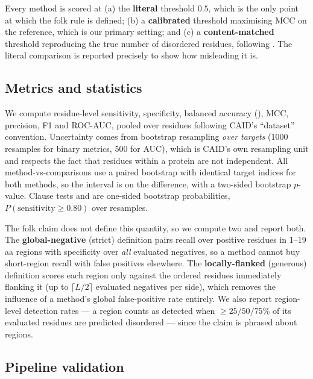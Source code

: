  Every method is scored at (a) the \textbf{literal} threshold
$0.5$, which is the only point at which the folk rule is defined; (b) a \textbf{calibrated}
threshold maximising MCC on the reference, which is our primary setting; and (c) a
\textbf{content-matched} threshold reproducing the true number of disordered residues, following
\citet{kurgan2023}. The literal comparison is reported precisely to show how misleading it is.

\subsection{Metrics and statistics}

We compute residue-level sensitivity, specificity, balanced accuracy (\bacc), MCC, precision,
F1 and ROC-AUC, pooled over residues following CAID's ``dataset'' convention. Uncertainty comes
from bootstrap resampling \emph{over targets} (1000 resamples for binary metrics, 500 for AUC),
which is CAID's own resampling unit and respects the fact that residues within a protein are not
independent. All method-vs-\plddt comparisons use a paired bootstrap with identical target
indices for both methods, so the interval is on the difference, with a two-sided bootstrap
$p$-value. Clause tests \cone and \ctwo are one-sided bootstrap probabilities, \eg
$P(\text{sensitivity} \ge 0.80)$ over resamples.

 The folk claim does not define
this quantity, so we compute two and report both. The \textbf{global-negative} (strict)
definition pairs recall over positive residues in 1--19 aa regions with specificity over
\emph{all} evaluated negatives, so a method cannot buy short-region recall with false positives
elsewhere. The \textbf{locally-flanked} (generous) definition scores each region only against
the ordered residues immediately flanking it (up to $\lceil L/2 \rceil$ evaluated negatives per
side), which removes the influence of a method's global false-positive rate entirely. We also
report region-level detection rates --- a region counts as detected when $\ge 25/50/75\%$ of its
evaluated residues are predicted disordered --- since the claim is phrased about regions.

\subsection{Pipeline validation}
\label{sec:validation}

